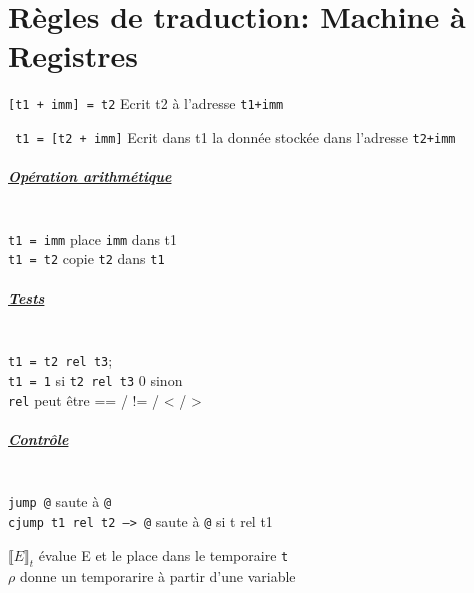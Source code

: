 \documentclass[12pt,twocolumn]{report}
\begin{document}
\chapter*{Règles de traduction: Machine à Registres}
\texttt{[t1 + imm] = t2} Ecrit t2 à l'adresse \texttt{t1+imm}

\texttt{ t1 = [t2 + imm]} Ecrit dans t1 la donnée stockée dans l'adresse \texttt{t2+imm}

\begin{trad}
    \paragraph*{ \underline{Opération arithmétique}}\hphantom{a}\\
    \texttt{t1 = imm} place \verb|imm| dans t1\\
    \texttt{t1 = t2} copie \verb|t2| dans \verb|t1|\\
\end{trad}
\begin{trad}
    \paragraph*{ \underline{Tests}}\hphantom{a}\\
    \texttt{t1 = t2 rel t3}; \\
    \verb|t1 = 1| si \texttt{t2 rel t3} 0 sinon\\
    \texttt{rel} peut être == / != / < / >\\
\end{trad}
\begin{trad}
    \paragraph*{ \underline{Contrôle}}\hphantom{a}\\
    \texttt{jump @} saute à \verb|@|\\
    \texttt{cjump t1 rel t2 --> @} saute à \verb|@| si t rel t1\\
\end{trad}
$\llbracket E \rrbracket_t$ évalue E et le place dans le temporaire \verb|t|\\
$\rho$ donne un temporarire à partir d'une variable\\
\end{document}
